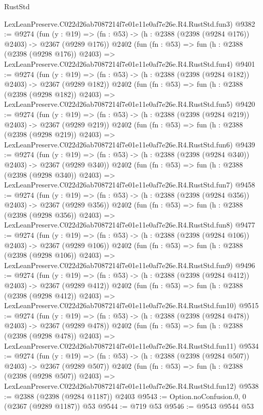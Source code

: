 \begin{lexlean}{RustStd}
\begin{coremodule}
    LexLeanPreserve.C022d26ab7087214f7e01e11e0af7e26e.R4.RustStd.fun3)
@9382 := @9274
    (fun (y : @19) => (fn : @53) -> (h : @2388 (@2398 (@9284 @176)) @2403) -> @2367 (@9289 @176))
    @2402
    (fun (fn : @53) =>
    fun (h : @2388 (@2398 (@9298 @176)) @2403) =>
    LexLeanPreserve.C022d26ab7087214f7e01e11e0af7e26e.R4.RustStd.fun4)
@9401 := @9274
    (fun (y : @19) => (fn : @53) -> (h : @2388 (@2398 (@9284 @182)) @2403) -> @2367 (@9289 @182))
    @2402
    (fun (fn : @53) =>
    fun (h : @2388 (@2398 (@9298 @182)) @2403) =>
    LexLeanPreserve.C022d26ab7087214f7e01e11e0af7e26e.R4.RustStd.fun5)
@9420 := @9274
    (fun (y : @19) => (fn : @53) -> (h : @2388 (@2398 (@9284 @219)) @2403) -> @2367 (@9289 @219))
    @2402
    (fun (fn : @53) =>
    fun (h : @2388 (@2398 (@9298 @219)) @2403) =>
    LexLeanPreserve.C022d26ab7087214f7e01e11e0af7e26e.R4.RustStd.fun6)
@9439 := @9274
    (fun (y : @19) => (fn : @53) -> (h : @2388 (@2398 (@9284 @340)) @2403) -> @2367 (@9289 @340))
    @2402
    (fun (fn : @53) =>
    fun (h : @2388 (@2398 (@9298 @340)) @2403) =>
    LexLeanPreserve.C022d26ab7087214f7e01e11e0af7e26e.R4.RustStd.fun7)
@9458 := @9274
    (fun (y : @19) => (fn : @53) -> (h : @2388 (@2398 (@9284 @356)) @2403) -> @2367 (@9289 @356))
    @2402
    (fun (fn : @53) =>
    fun (h : @2388 (@2398 (@9298 @356)) @2403) =>
    LexLeanPreserve.C022d26ab7087214f7e01e11e0af7e26e.R4.RustStd.fun8)
@9477 := @9274
    (fun (y : @19) => (fn : @53) -> (h : @2388 (@2398 (@9284 @106)) @2403) -> @2367 (@9289 @106))
    @2402
    (fun (fn : @53) =>
    fun (h : @2388 (@2398 (@9298 @106)) @2403) =>
    LexLeanPreserve.C022d26ab7087214f7e01e11e0af7e26e.R4.RustStd.fun9)
@9496 := @9274
    (fun (y : @19) => (fn : @53) -> (h : @2388 (@2398 (@9284 @412)) @2403) -> @2367 (@9289 @412))
    @2402
    (fun (fn : @53) =>
    fun (h : @2388 (@2398 (@9298 @412)) @2403) =>
    LexLeanPreserve.C022d26ab7087214f7e01e11e0af7e26e.R4.RustStd.fun10)
@9515 := @9274
    (fun (y : @19) => (fn : @53) -> (h : @2388 (@2398 (@9284 @478)) @2403) -> @2367 (@9289 @478))
    @2402
    (fun (fn : @53) =>
    fun (h : @2388 (@2398 (@9298 @478)) @2403) =>
    LexLeanPreserve.C022d26ab7087214f7e01e11e0af7e26e.R4.RustStd.fun11)
@9534 := @9274
    (fun (y : @19) => (fn : @53) -> (h : @2388 (@2398 (@9284 @507)) @2403) -> @2367 (@9289 @507))
    @2402
    (fun (fn : @53) =>
    fun (h : @2388 (@2398 (@9298 @507)) @2403) =>
    LexLeanPreserve.C022d26ab7087214f7e01e11e0af7e26e.R4.RustStd.fun12)
@9538 := @2388 (@2398 (@9284 @1187)) @2403
@9543 := Option.noConfusion.{0, 0} (@2367 (@9289 @1187)) @53
@9544 := @719 @53
@9546 := @9543 @9544 @53

\end{coremodule}
\end{lexlean}
